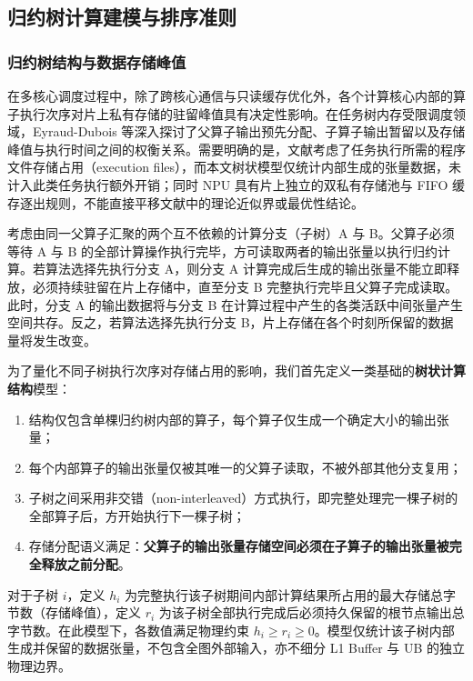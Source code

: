 \documentclass[anonymous,withtoc]{gmcm2026}
\providecommand{\tightlist}{\setlength{\itemsep}{0pt}\setlength{\parskip}{0pt}}
\begin{document}
\subsection{归约树计算建模与排序准则}

\subsubsection{归约树结构与数据存储峰值}

在多核心调度过程中，除了跨核心通信与只读缓存优化外，各个计算核心内部的算子执行次序对片上私有存储的驻留峰值具有决定性影响。在任务树内存受限调度领域，Eyraud-Dubois 等\cite{ref21}深入探讨了父算子输出预先分配、子算子输出暂留以及存储峰值与执行时间之间的权衡关系。需要明确的是，文献\cite{ref21}考虑了任务执行所需的程序文件存储占用（execution files），而本文树状模型仅统计内部生成的张量数据，未计入此类任务执行额外开销；同时 NPU 具有片上独立的双私有存储池与 FIFO 缓存逐出规则，不能直接平移文献\cite{ref21}中的理论近似界或最优性结论。

考虑由同一父算子汇聚的两个互不依赖的计算分支（子树）A 与 B。父算子必须等待 A 与 B 的全部计算操作执行完毕，方可读取两者的输出张量以执行归约计算。若算法选择先执行分支 A，则分支 A 计算完成后生成的输出张量不能立即释放，必须持续驻留在片上存储中，直至分支 B 完整执行完毕且父算子完成读取。此时，分支 A 的输出数据将与分支 B 在计算过程中产生的各类活跃中间张量产生空间共存。反之，若算法选择先执行分支 B，片上存储在各个时刻所保留的数据量将发生改变。

为了量化不同子树执行次序对存储占用的影响，我们首先定义一类基础的\textbf{树状计算结构}模型：

\begin{enumerate}
\def\labelenumi{\arabic{enumi}.}
\tightlist
\item
  结构仅包含单棵归约树内部的算子，每个算子仅生成一个确定大小的输出张量；
\item
  每个内部算子的输出张量仅被其唯一的父算子读取，不被外部其他分支复用；
\item
  子树之间采用非交错（non-interleaved）方式执行，即完整处理完一棵子树的全部算子后，方开始执行下一棵子树；
\item
  存储分配语义满足：\textbf{父算子的输出张量存储空间必须在子算子的输出张量被完全释放之前分配}。
\end{enumerate}

对于子树 \(i\)，定义 \(h_i\) 为完整执行该子树期间内部计算结果所占用的最大存储总字节数（存储峰值），定义 \(r_i\) 为该子树全部执行完成后必须持久保留的根节点输出总字节数。在此模型下，各数值满足物理约束 \(h_i \ge r_i \ge 0\)。模型仅统计该子树内部生成并保留的数据张量，不包含全图外部输入，亦不细分 L1 Buffer 与 UB 的独立物理边界。
\end{document}
